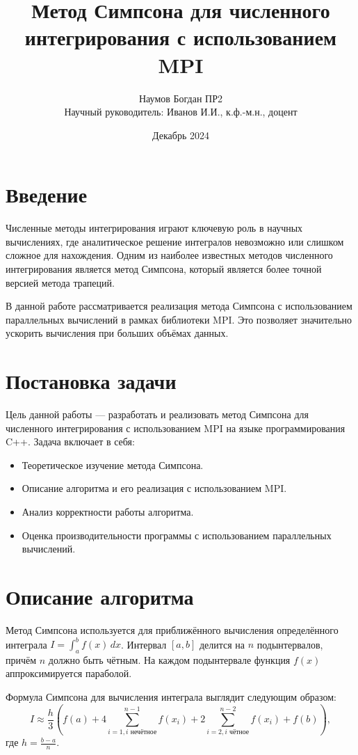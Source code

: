 \documentclass{article}
\title{Метод Симпсона для численного интегрирования с использованием MPI}
\author{Наумов Богдан ПР2\\Научный руководитель: Иванов И.И., к.ф.-м.н., доцент}
\date{Декабрь 2024}
\begin{document}
\maketitle

\section{Введение}
Численные методы интегрирования играют ключевую роль в научных вычислениях, где аналитическое решение интегралов невозможно или слишком сложное для нахождения. Одним из наиболее известных методов численного интегрирования является метод Симпсона, который является более точной версией метода трапеций.

В данной работе рассматривается реализация метода Симпсона с использованием параллельных вычислений в рамках библиотеки MPI. Это позволяет значительно ускорить вычисления при больших объёмах данных.

\section{Постановка задачи}
Цель данной работы — разработать и реализовать метод Симпсона для численного интегрирования с использованием MPI на языке программирования C++. Задача включает в себя:
\begin{itemize}
    \item Теоретическое изучение метода Симпсона.
    \item Описание алгоритма и его реализация с использованием MPI.
    \item Анализ корректности работы алгоритма.
    \item Оценка производительности программы с использованием параллельных вычислений.
\end{itemize}

\section{Описание алгоритма}
Метод Симпсона используется для приближённого вычисления определённого интеграла \( I = \int_a^b f(x) \, dx \). Интервал \([a, b]\) делится на \(n\) подынтервалов, причём \(n\) должно быть чётным. На каждом подынтервале функция \(f(x)\) аппроксимируется параболой.

Формула Симпсона для вычисления интеграла выглядит следующим образом:
\[
I \approx \frac{h}{3} \left( f(a) + 4 \sum_{i=1, i \text{ нечётное}}^{n-1} f(x_i) + 2 \sum_{i=2, i \text{ чётное}}^{n-2} f(x_i) + f(b) \right),
\]
где \(h = \frac{b-a}{n}\).
\end{document}
